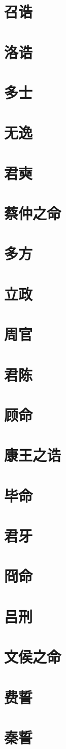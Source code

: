 \documentclass[a4paper,12pt,UTF8,twoside]{ctexbook}
\begin{document}
\chapter{召诰}
\chapter{洛诰}
\chapter{多士}
\chapter{无逸}
\chapter{君奭}
\chapter{蔡仲之命}
\chapter{多方}
\chapter{立政}
\chapter{周官}
\chapter{君陈}
\chapter{顾命}
\chapter{康王之诰}
\chapter{毕命}
\chapter{君牙}
\chapter{冏命}
\chapter{吕刑}
\chapter{文侯之命}
\chapter{费誓}
\chapter{秦誓}
\end{document}
